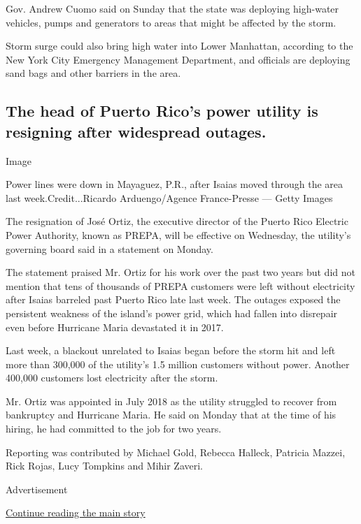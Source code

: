 Gov. Andrew Cuomo said on Sunday that the state was deploying high-water
vehicles, pumps and generators to areas that might be affected by the
storm.

Storm surge could also bring high water into Lower Manhattan, according
to the New York City Emergency Management Department, and officials are
deploying sand bags and other barriers in the area.

\hypertarget{the-head-of-puerto-ricos-power-utility-is-resigning-after-widespread-outages}{%
\subsection{The head of Puerto Rico's power utility is resigning after
widespread
outages.}\label{the-head-of-puerto-ricos-power-utility-is-resigning-after-widespread-outages}}

Image

Power lines were down in Mayaguez, P.R., after Isaias moved through the
area last week.Credit...Ricardo Arduengo/Agence France-Presse --- Getty
Images

The resignation of José Ortiz, the executive director of the Puerto Rico
Electric Power Authority, known as PREPA, will be effective on
Wednesday, the utility's governing board said in a statement on Monday.

The statement praised Mr. Ortiz for his work over the past two years but
did not mention that tens of thousands of PREPA customers were left
without electricity after Isaias barreled past Puerto Rico late last
week. The outages exposed the persistent weakness of the island's power
grid, which had fallen into disrepair even before Hurricane Maria
devastated it in 2017.

Last week, a blackout unrelated to Isaias began before the storm hit and
left more than 300,000 of the utility's 1.5 million customers without
power. Another 400,000 customers lost electricity after the storm.

Mr. Ortiz was appointed in July 2018 as the utility struggled to recover
from bankruptcy and Hurricane Maria. He said on Monday that at the time
of his hiring, he had committed to the job for two years.

Reporting was contributed by Michael Gold, Rebecca Halleck, Patricia
Mazzei, Rick Rojas, Lucy Tompkins and Mihir Zaveri.

Advertisement

\protect\hyperlink{after-bottom}{Continue reading the main story}

